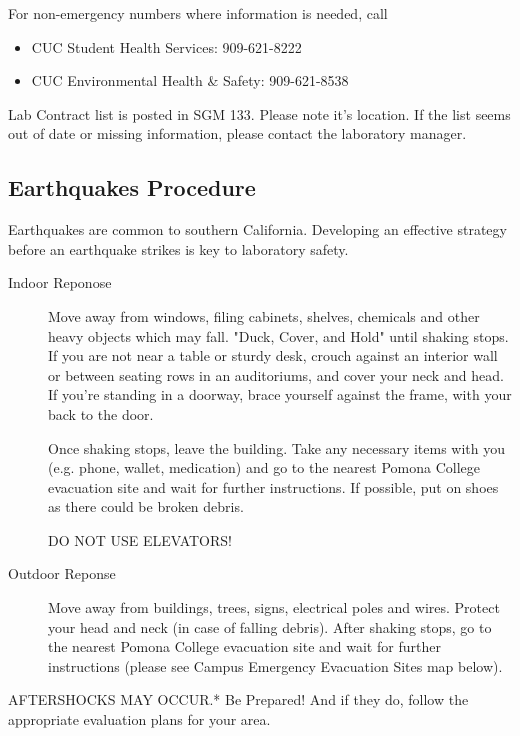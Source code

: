 \documentclass[12pt]{../SOP4_alpha}\usepackage[]{graphicx}\usepackage[]{xcolor}
\begin{document}
\NP For non-emergency numbers where information is needed, call 
 
\begin{itemize}
  \item CUC Student Health Services: 909-621-8222
  \item CUC Environmental Health \& Safety: 909-621-8538 
\end{itemize}

\NP Lab Contract list is posted in SGM 133. Please note it's location. If the list seems out of date or missing information, please contact the laboratory manager.

\subsection*{Earthquakes Procedure} 

\NP Earthquakes are common to southern California. Developing an effective strategy before an earthquake strikes is key to laboratory safety.

\begin{description}
  \item[Indoor Reponose] Move away from windows, filing cabinets, shelves, chemicals and other heavy objects which may fall. "Duck, Cover, and Hold" until shaking stops. If you are not near a table or sturdy desk, crouch against an interior wall or between seating rows in an auditoriums, and cover your neck and head. If you’re standing in a doorway, brace yourself against the frame, with your back to the door.

Once shaking stops, leave the building. Take any necessary items with you (e.g. phone, wallet, medication) and go to the nearest Pomona College evacuation site and wait for further instructions. If possible, put on shoes as there could be broken debris. 

DO NOT USE ELEVATORS!

\item[Outdoor Reponse] Move away from buildings, trees, signs, electrical poles and wires.
Protect your head and neck (in case of falling debris).
After shaking stops, go to the nearest Pomona College evacuation site and wait for further instructions (please see Campus Emergency Evacuation Sites map below).

\end{description}
	
\NP *AFTERSHOCKS MAY OCCUR.* Be Prepared! And if they do, follow the appropriate evaluation plans for your area.
\end{document}
